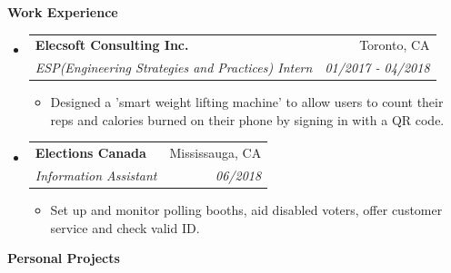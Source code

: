 \documentclass[letterpaper,11pt]{article}
\makeatletter
\newcommand{\resitem}[1]{\item #1 \vspace{-2pt}}
\newcommand{\resheading}[1]{{\large \colorbox{mygrey}{\begin{minipage}{\textwidth}{\textbf{#1 \vphantom{p\^{E}}}}\end{minipage}}}}
\newcommand{\ressubheading}[4]{
\begin{tabular*}{7.0in}{l@{\extracolsep{\fill}}r}
		\textbf{#1} & #2 \\
		\textit{#3} & \textit{#4} \\
\end{tabular*}\vspace{-6pt}}
\makeatother
\begin{document}

\resheading{Work Experience}
\begin{itemize}
\item
	\ressubheading{Elecsoft Consulting Inc.}{Toronto, CA}{ESP(Engineering Strategies and Practices) Intern}{01/2017 - 04/2018}
	\begin{itemize}
		\resitem{Designed a 'smart weight lifting machine' to allow users to count their reps and calories burned on their phone by signing in with a QR code.}
	\end{itemize}

\item
	\ressubheading{Elections Canada}{Mississauga, CA}{Information Assistant}{06/2018}
	\begin{itemize}
		\resitem{Set up and monitor polling booths, aid disabled voters, offer customer service and check valid ID.}
	\end{itemize}
	
    
\end{itemize}


\resheading{Personal Projects}
\end{document}
